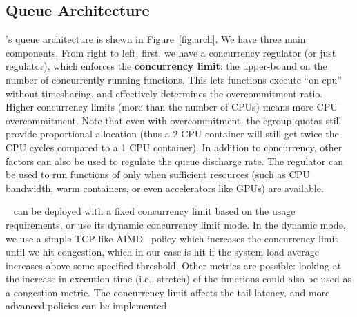 \subsection{Queue Architecture}
\label{sec:q:arch}

\sysname's queue architecture is shown in Figure~\ref{fig:arch}.
We have three main components.
%
From right to left, first, we have a concurrency regulator (or just regulator), which enforces the \textbf{concurrency limit}: the  upper-bound on the number of concurrently running functions. 
%
This lets functions execute ``on cpu'' without timesharing, and effectively determines the overcommitment ratio.
Higher concurrency limits (more than the number of CPUs) means  more CPU overcommitment.
Note that even with overcommitment, the cgroup quotas still provide proportional allocation (thus a 2 CPU container will still get twice the CPU cycles compared to a 1 CPU container). 
%
In addition to concurrency, other factors can also be used to regulate the queue discharge rate. 
The regulator can be used to run functions of only when sufficient resources (such as CPU bandwidth, warm containers, or even accelerators like GPUs) are available. 


\sysname~ can be deployed with a fixed concurrency limit based on the usage requirements, or use its dynamic concurrency limit mode. 
In the dynamic mode, we use a simple TCP-like AIMD~\cite{yang2000general} policy which increases the concurrency limit until we hit congestion, which in our case is hit if the system load average increases above some specified threshold. 
Other metrics are possible: looking at the increase in execution time (i.e., stretch) of the functions could also be used as a congestion metric.
The concurrency limit affects the tail-latency, and more advanced policies can be implemented. 


\begin{comment}
Having the container map also allows us to implement \textbf{concurrent cold-start mitigation}.
If the function at the head of the queue has no warm containers available, and one of its instantiations is running, then we put the function back in the queue.
As a function's warm start is typically orders of magnitude shorter than cold starts, it is better for it to wait for warm container than to cold start one.
We implement this by asking the container pool for a warm container, and if it fails to give us one we can re-queue the invocation for the future.
Optionally, we can allow for a cold start to increase the number of warm containers for a function, naturally scaling if there is an increase in frequency.
\end{comment}

